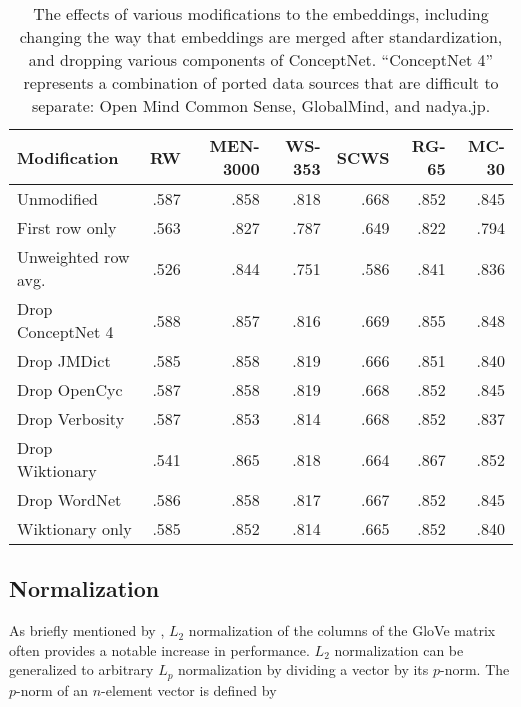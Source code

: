 \documentclass[letterpaper]{article}
\begin{document}
\begin{table*}[t]
\centering
\begin{tabular}{lrrrrrr}
\toprule
Modification        &   RW &  MEN-3000 &  WS-353 &  SCWS &  RG-65 &  MC-30 \\
\midrule
Unmodified          & .587 &      .858 &    .818 &  .668 &   .852 &   .845 \\
\midrule
First row only      & .563 &      .827 &    .787 &  .649 &   .822 &   .794 \\
Unweighted row avg. & .526 &      .844 &    .751 &  .586 &   .841 &   .836 \\
\midrule
Drop ConceptNet 4   & .588 &      .857 &    .816 &  .669 &   .855 &   .848 \\
Drop JMDict         & .585 &      .858 &    .819 &  .666 &   .851 &   .840 \\
Drop OpenCyc        & .587 &      .858 &    .819 &  .668 &   .852 &   .845 \\
Drop Verbosity      & .587 &      .853 &    .814 &  .668 &   .852 &   .837 \\
Drop Wiktionary     & .541 &      .865 &    .818 &  .664 &   .867 &   .852 \\
Drop WordNet        & .586 &      .858 &    .817 &  .667 &   .852 &   .845 \\
Wiktionary only     & .585 &      .852 &    .814 &  .665 &   .852 &   .840 \\
\bottomrule
\end{tabular}
\caption{
    The effects of various modifications to the embeddings, including
    changing the way that embeddings are merged after standardization, and
    dropping various components of ConceptNet. ``ConceptNet 4''
    represents a combination of ported data sources that are difficult to
    separate: Open Mind Common Sense, GlobalMind, and nadya.jp.
}
\label{eval-variations}
\end{table*}

\subsection{Normalization}

As briefly mentioned by , $L_2$ normalization of
the columns of the GloVe matrix often provides a notable increase in
performance. $L_2$ normalization can be generalized to arbitrary
$L_p$ normalization by dividing a vector by its $p$-norm. The $p$-norm of an
$n$-element vector is defined by
\end{document}
